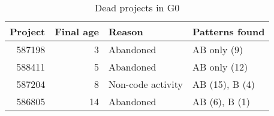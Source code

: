 \begin{table}[H]
\caption{Dead projects in G0}\label{table:deads_g0}
\centering
\begin{tabular}{rrll}
\hline
	\textbf{Project} & \textbf{Final age} & \textbf{Reason} & \textbf{Patterns
	found} \\
	\hline
	587198 & 3 & Abandoned & AB only (9) \\
	588411 & 5 & Abandoned & AB only (12) \\
	587204 & 8 & Non-code activity & AB (15), B (4) \\
	586805 & 14 & Abandoned & AB (6), B (1) \\
\hline
\end{tabular}
\end{table}